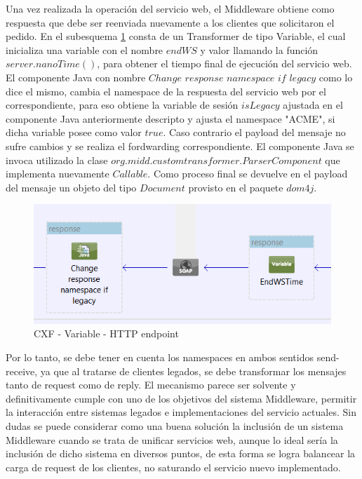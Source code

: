 \documentclass[12pt]{article}
\begin{document}
Una vez realizada la operación del servicio web, el Middleware obtiene como respuesta que debe ser reenviada nuevamente a los clientes que solicitaron el pedido. En el subesquema \ref{fig:g4} consta de un Transformer de tipo Variable, el cual inicializa una variable con el nombre $endWS$ y valor llamando la función $server.nanoTime()$, para obtener el tiempo final de ejecución del servicio web.
El componente Java con nombre $Change$ $response$ $namespace$ $if$ $legacy$ como lo dice el mismo, cambia el namespace de la respuesta del servicio web por el correspondiente, para eso obtiene la variable de sesión $isLegacy$ ajustada en el componente Java anteriormente descripto y ajusta el namespace "ACME", si dicha variable posee como valor $true$. Caso contrario el payload del mensaje no sufre cambios y se realiza el fordwarding correspondiente.
El componente Java se invoca utilizado la clase $org.midd.customtransformer.ParserComponent$ que implementa nuevamente $Callable$. Como proceso final se devuelve en el payload del mensaje un objeto del tipo $Document$ provisto en el paquete $dom4j$.

\begin{figure}[!h]
  \centering
    \includegraphics[scale=0.7]{./images/g4.png}
  \caption{CXF - Variable - HTTP endpoint}
  \label{fig:g4}
\end{figure} 


Por lo tanto, se debe tener en cuenta los namespaces en ambos sentidos send-receive, ya que al tratarse de clientes legados, se debe transformar los mensajes tanto de request como de reply. El mecanismo parece ser solvente y definitivamente cumple con uno de los objetivos del sistema Middleware, permitir la interacción entre sistemas legados e implementaciones del servicio actuales. Sin dudas se puede considerar como una buena solución la inclusión de un sistema Middleware cuando se trata de unificar servicios web, aunque lo ideal sería la inclusión de dicho sistema en diversos puntos, de esta forma se logra balancear la carga de request de los clientes, no saturando el servicio nuevo implementado.
\end{document}
